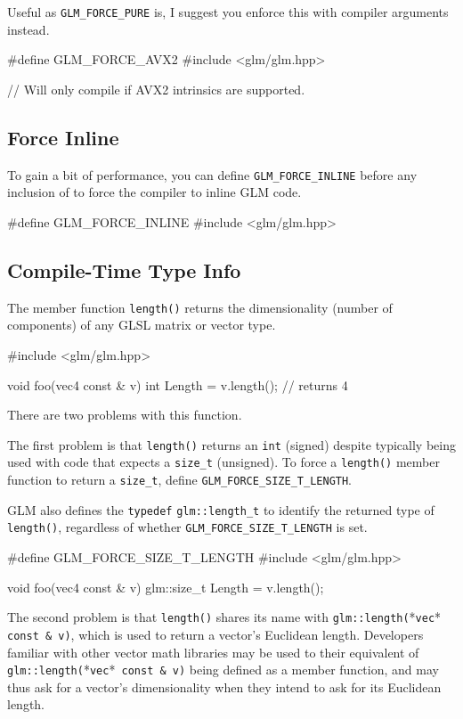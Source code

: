 \documentclass{scrartcl}
\numberwithin{figure}{subsection}
\begin{document}
Useful as \verb|GLM_FORCE_PURE| is, I suggest you enforce this with compiler arguments instead.

\begin{cppcode}
#define GLM_FORCE_AVX2
#include <glm/glm.hpp>

// Will only compile if AVX2 intrinsics are supported.
\end{cppcode}

\subsection{Force Inline}
To gain a bit of performance, you can define \verb|GLM_FORCE_INLINE| before any inclusion of  to force the compiler to inline GLM code.

\begin{cppcode}
#define GLM_FORCE_INLINE 
#include <glm/glm.hpp>
\end{cppcode}

\subsection{Compile-Time Type Info}
The member function \verb|length()| returns the dimensionality (number of components) of any GLSL matrix or vector type.

\begin{cppcode}
#include <glm/glm.hpp>

void foo(vec4 const & v)
{
  int Length = v.length();  // returns 4
}
\end{cppcode}

There are two problems with this function.

The first problem is that \verb|length()| returns an \verb|int| (signed) despite typically being used with code that expects a \verb|size_t| (unsigned). To force a \verb|length()| member function to return a \verb|size_t|, define \verb|GLM_FORCE_SIZE_T_LENGTH|.

GLM also defines the \verb|typedef| \verb|glm::length_t| to identify the returned type of \verb|length()|, regardless of whether \verb|GLM_FORCE_SIZE_T_LENGTH| is set.

\begin{cppcode}
#define GLM_FORCE_SIZE_T_LENGTH 
#include <glm/glm.hpp>

void foo(vec4 const & v)
{
  glm::size_t Length = v.length();
}
\end{cppcode}

The second problem is that \verb|length()| shares its name with \verb|glm::length(|*\verb|vec|*\verb| const & v)|, which is used to return a vector's Euclidean length. Developers familiar with other vector math libraries may be used to their equivalent of \verb|glm::length(|*\verb|vec|*\verb| const & v)| being defined as a member function, and may thus ask for a vector's dimensionality when they intend to ask for its Euclidean length.
\end{document}

